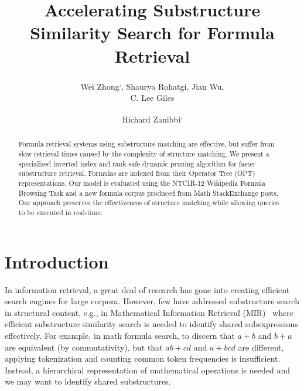\documentclass[runningheads]{llncs}
\begin{document}
%
\title{Accelerating Substructure Similarity Search for Formula Retrieval}

\author{Wei Zhong\textsuperscript{,\Letter}, Shaurya Rohatgi, Jian Wu, \\ C. Lee Giles \and Richard Zanibbi\textsuperscript{,\Letter}}


\maketitle

\begin{abstract}
Formula retrieval systems using substructure matching are effective, but suffer from slow retrieval times caused by the complexity of structure matching.  We present a specialized inverted index and rank-safe dynamic pruning algorithm for faster substructure retrieval. Formulas are indexed from their Operator Tree (OPT) representations. Our model is evaluated using the NTCIR-12 Wikipedia Formula Browsing Task and a new formula corpus produced from Math StackExchange posts.  Our approach preserves the effectiveness of structure matching while allowing queries to be executed in real-time.

\end{abstract}

\section{Introduction}
In information retrieval, a great deal of research has gone into creating efficient search engines for large corpora.
However, few have addressed substructure search in structural content, e.g., in Mathematical Information Retrieval (MIR)~\cite{survey2012} where efficient substructure similarity search is needed to identify shared subexpressions effectively.
For example, in math formula search, to discern that $a+b$ and $b + a$ are equivalent (by commutativity), but that $ab+cd$ and $a+bcd$ are different,  applying tokenization and counting common token frequencies is insufficient. Instead, a hierarchical representation of mathematical operations is needed and we may want to identify shared substructures.
\end{document}
